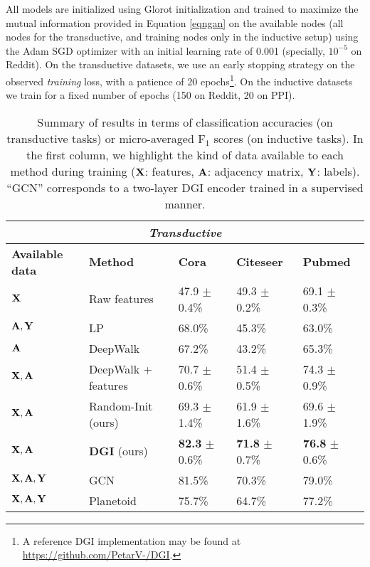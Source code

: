 \documentclass{article} \usepackage{iclr2019_conference,times}
\begin{document}
All models are initialized using Glorot initialization \citep{glorot2010understanding} and trained to maximize the mutual information provided in Equation \ref{eqngan} on the available nodes (all nodes for the transductive, and training nodes only in the inductive setup) using the Adam SGD optimizer \citep{kingma2014adam} with an initial learning rate of 0.001 (specially, $10^{-5}$ on Reddit). On the transductive datasets, we use an early stopping strategy on the observed \emph{training} loss, with a patience of 20 epochs\footnote{
A reference DGI implementation may be found at \url{https://github.com/PetarV-/DGI}.}. On the inductive datasets we train for a fixed number of epochs (150 on Reddit, 20 on PPI).



\begin{table}[ht]
\caption{Summary of results in terms of classification accuracies (on transductive tasks) or micro-averaged F$_1$ scores (on inductive tasks). In the first column, we highlight the kind of data available to each method during training (${\bf X}$: features, ${\bf A}$: adjacency matrix, ${\bf Y}$: labels). ``GCN'' corresponds to a two-layer DGI encoder trained in a supervised manner.}
\label{transtable}
\begin{center}
\begin{tabular}{l l l l l}
\multicolumn{5}{c}{\textbf{\emph{Transductive}}}\\
\toprule
{\bf Available data} & {\bf Method} & {\bf Cora} & {\bf Citeseer} & {\bf Pubmed}\\ \midrule
${\bf X}$ & Raw features & 47.9 $\pm$ 0.4\% & 49.3 $\pm$ 0.2\% & 69.1 $\pm$ 0.3\%\\
${\bf A}, {\bf Y}$ & LP \citep{zhu2003semi} & 68.0\% & 45.3\% & 63.0\%\\
${\bf A}$ & DeepWalk \citep{perozzi2014deepwalk} & 67.2\% & 43.2\% & 65.3\%\\
${\bf X}, {\bf A}$ & DeepWalk + features & 70.7 $\pm$ 0.6\% & 51.4 $\pm$ 0.5\% & 74.3 $\pm$ 0.9\%\\\midrule
${\bf X}, {\bf A}$ & Random-Init (ours) & 69.3 $\pm$ 1.4\% & 61.9 $\pm$ 1.6\% & 69.6 $\pm$ 1.9\% \\
${\bf X}, {\bf A}$ & {\bf DGI} (ours) & {\bf 82.3} $\pm$ 0.6\% & {\bf 71.8} $\pm$ 0.7\% & {\bf 76.8} $\pm$ 0.6\%\\\midrule
${\bf X}, {\bf A}, {\bf Y}$ & GCN \citep{kipf2016semi} & 81.5\% & 70.3\% & 79.0\%\\
${\bf X}, {\bf A}, {\bf Y}$ & Planetoid \citep{yang2016revisiting} & 75.7\% & 64.7\% & 77.2\%\\

\end{tabular}
\end{center}
\end{table}
\end{document}
